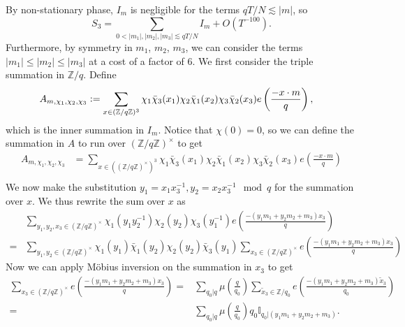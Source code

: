 By non-stationary phase, $I_m$ is negligible for the terms $qT/N\lesssim |m|$, so 
\begin{equation}
    S_3 = \sum_{0<|m_1|,|m_2|,|m_3|\lesssim qT/N} I_m + O(T^{-100}).
\end{equation}
Furthermore, by symmetry in $m_1$, $m_2$, $m_3$, we can consider the terms $|m_1|\leq |m_2|\leq |m_3|$ at a cost of a factor of $6$.
We first consider the triple summation in $\mathbb{Z}/q$. Define \begin{align*}
    A_{m,\chi_1,\chi_2,\chi_3}&\mathrel{\mathop:}= \sum_{x\in (\mathbb{Z}/q\mathbb{Z})^3}\chi_1\bar{\chi}_3(x_1)\chi_2\bar{\chi}_1(x_2)\chi_3\bar{\chi}_2(x_3) e\left(\frac{-x\cdot m}{q}\right),
\end{align*}
which is the inner summation in $I_m$.
Notice that $\chi(0)=0$, so we can define the summation in $A$ to run over $(\mathbb{Z}/q\mathbb{Z})^\times$ to get 
\begin{align*}
    A_{m,\chi_1,\chi_2,\chi_3}&= \sum_{x\in ((\mathbb{Z}/q\mathbb{Z})^\times)^3}\chi_1\bar{\chi}_3(x_1)\chi_2\bar{\chi}_1(x_2)\chi_3\bar{\chi}_2(x_3) e\left(\frac{-x\cdot m}{q}\right)\\
\end{align*}
We now make the substitution $y_1=x_1x_3^{-1}, y_2=x_2x_3^{-1} \mod q$ for the summation over $x$.
We thus rewrite the sum over $x$ as 
\begin{align*}
    &\sum_{y_1,y_2,x_3\in (\mathbb{Z}/q\mathbb{Z})^\times}
    \chi_1(y_1y_2^{-1})\chi_2(y_2)\chi_3(y_1^{-1})e\left(\frac{-(y_1m_1+y_2m_2+m_3)x_3}{q}\right)\\
    =&
    \sum_{y_1,y_2\in (\mathbb{Z}/q\mathbb{Z})^\times}\chi_1(y_1)\bar{\chi}_1(y_2)\chi_2(y_2)\bar{\chi}_3(y_1)\sum_{x_3\in (\mathbb{Z}/q\mathbb{Z})^\times}e\left(\frac{-(y_1m_1+y_2m_2+m_3)x_3}{q}\right)
\end{align*}
Now we can apply M\"obius inversion on the summation in $x_3$ to get \begin{align*}
   \sum_{x_3\in (\mathbb{Z}/q\mathbb{Z})^\times}e\left(\frac{-(y_1m_1+y_2m_2+m_3)x_3}{q}\right)=& \sum_{q_0|q} \mu\left(\frac{q}{q_0}\right)\sum_{\tilde{x}_3\in \mathbb{Z}/q_0}e\left(\frac{-(y_1m_1+y_2m_2+m_3)\tilde{x}_3}{q_0}\right) \\ =& \sum_{q_0|q} \mu\left(\frac{q}{q_0}\right) q_0 \mathbb{I}_{q_0|(y_1m_1+y_2m_2+m_3)}.
\end{align*}

